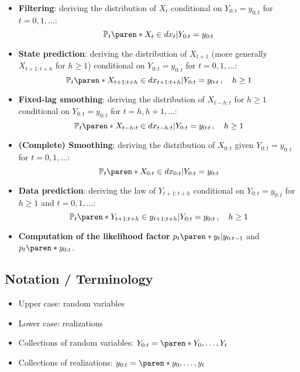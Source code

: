 \begin{itemize}
    \item \textbf{Filtering}: deriving the distribution of $X_{t}$ conditional on $Y_{0:t} = y_{0:t}$ for $t = 0, 1, \ldots$:
    \begin{equation}
        \mathbb{P}_{t} \paren*{ X_{t} \in dx_{t} \vert Y_{0:t} = y_{0:t}}
    \end{equation}
    \item \textbf{State prediction}: deriving the distribution of $X_{t+1}$ (more generally $X_{t+1:t+h}$ for $h \geq 1$) conditional on $Y_{0:t} = y_{0:t}$ for $t = 0, 1, \ldots$:
    \begin{equation}
        \mathbb{P}_{t} \paren*{ X_{t+1:t+h} \in dx_{t+1:t+h} \vert Y_{0:t} = y_{0:t} }
        \,, \quad h \geq 1
    \end{equation}
    \item \textbf{Fixed-lag smoothing}: deriving the distribution of $X_{t - h:t}$ for $h \geq 1$ conditional on $Y_{0:t} = y_{0:t}$ for $t = h, h+1, \ldots$:
    \begin{equation}
        \mathbb{P}_{t} \paren*{ X_{t-h:t} \in dx_{t-h:t} \vert Y_{0:t} = y_{0:t} }
        \,, \quad h \geq 1
    \end{equation}
    \item \textbf{(Complete) Smoothing}: deriving the distribution of $X_{0:t}$ given $Y_{0:t} = y_{0:t}$ for $t = 0, 1, \ldots$:
    \begin{equation}
        \mathbb{P}_{t} \paren*{ X_{0:t} \in dx_{0:t} \vert Y_{0:t} = y_{0:t} }
    \end{equation}
    \item \textbf{Data prediction}: deriving the law of $Y_{t+1:t+h}$ conditional on $Y_{0:t} = y_{0:t}$ for $h \geq 1$ and $t = 0, 1, \ldots$:
    \begin{equation}
        \mathbb{P}_{t} \paren*{ Y_{t+1:t+h} \in y_{t+1:t+h} \vert Y_{0:t} = y_{0:t} }
        \,, \quad h \geq 1
    \end{equation}
    \item \textbf{Computation of the likelihood factor} $p_{t} \paren*{y_{t} \vert y_{0:t-1}}$ and $p_{t} \paren*{y_{0:t}}$.
\end{itemize}

\subsection*{Notation / Terminology}

\begin{itemize}
    \item Upper case: random variables
    \item Lower case: realizations
    \item Collections of random variables: $Y_{0:t} = \paren*{Y_{0}, \ldots, Y_{t}}$
    \item Collections of realizations: $y_{0:t} = \paren*{y_{0}, \ldots, y_{t}}$
\end{itemize}